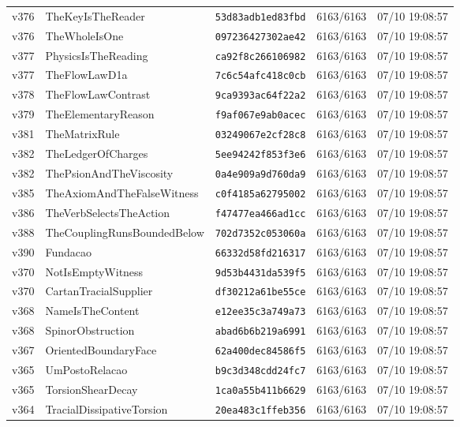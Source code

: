 \documentclass[11pt]{article}
\theoremstyle{definition}\newtheorem{deriv}{Derivation}
\begin{document}
{\begin{longtable}{@{}lllll@{}}
v376 & TheKeyIsTheReader & \texttt{53d83adb1ed83fbd} & 6163/6163 & 07/10 19:08:57 \\
v376 & TheWholeIsOne & \texttt{097236427302ae42} & 6163/6163 & 07/10 19:08:57 \\
v377 & PhysicsIsTheReading & \texttt{ca92f8c266106982} & 6163/6163 & 07/10 19:08:57 \\
v377 & TheFlowLawD1a & \texttt{7c6c54afc418c0cb} & 6163/6163 & 07/10 19:08:57 \\
v378 & TheFlowLawContrast & \texttt{9ca9393ac64f22a2} & 6163/6163 & 07/10 19:08:57 \\
v379 & TheElementaryReason & \texttt{f9af067e9ab0acec} & 6163/6163 & 07/10 19:08:57 \\
v381 & TheMatrixRule & \texttt{03249067e2cf28c8} & 6163/6163 & 07/10 19:08:57 \\
v382 & TheLedgerOfCharges & \texttt{5ee94242f853f3e6} & 6163/6163 & 07/10 19:08:57 \\
v382 & ThePsionAndTheViscosity & \texttt{0a4e909a9d760da9} & 6163/6163 & 07/10 19:08:57 \\
v385 & TheAxiomAndTheFalseWitness & \texttt{c0f4185a62795002} & 6163/6163 & 07/10 19:08:57 \\
v386 & TheVerbSelectsTheAction & \texttt{f47477ea466ad1cc} & 6163/6163 & 07/10 19:08:57 \\
v388 & TheCouplingRunsBoundedBelow & \texttt{702d7352c053060a} & 6163/6163 & 07/10 19:08:57 \\
v390 & Fundacao & \texttt{66332d58fd216317} & 6163/6163 & 07/10 19:08:57 \\
v370 & NotIsEmptyWitness & \texttt{9d53b4431da539f5} & 6163/6163 & 07/10 19:08:57 \\
v370 & CartanTracialSupplier & \texttt{df30212a61be55ce} & 6163/6163 & 07/10 19:08:57 \\
v368 & NameIsTheContent & \texttt{e12ee35c3a749a73} & 6163/6163 & 07/10 19:08:57 \\
v368 & SpinorObstruction & \texttt{abad6b6b219a6991} & 6163/6163 & 07/10 19:08:57 \\
v367 & OrientedBoundaryFace & \texttt{62a400dec84586f5} & 6163/6163 & 07/10 19:08:57 \\
v365 & UmPostoRelacao & \texttt{b9c3d348cdd24fc7} & 6163/6163 & 07/10 19:08:57 \\
v365 & TorsionShearDecay & \texttt{1ca0a55b411b6629} & 6163/6163 & 07/10 19:08:57 \\
v364 & TracialDissipativeTorsion & \texttt{20ea483c1ffeb356} & 6163/6163 & 07/10 19:08:57 \\

\end{longtable}}
\end{document}

